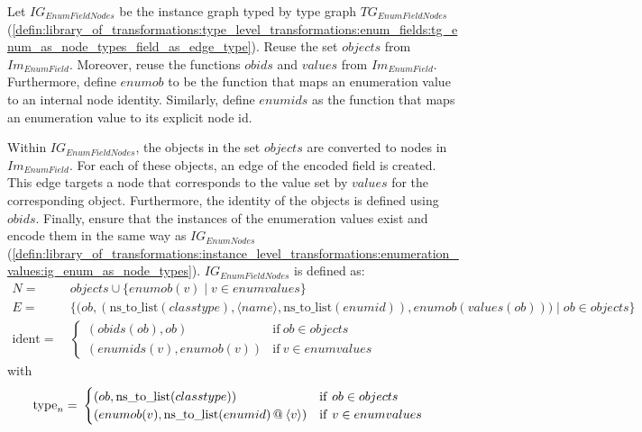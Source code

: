\begin{defin}
\label{defin:library_of_transformations:instance_level_transformations:enum_field_values:ig_enum_as_node_types_field_as_edge_type}
Let $IG_{EnumFieldNodes}$ be the instance graph typed by type graph $TG_{EnumFieldNodes}$ (\cref{defin:library_of_transformations:type_level_transformations:enum_fields:tg_enum_as_node_types_field_as_edge_type}). Reuse the set $objects$ from $Im_{EnumField}$. Moreover, reuse the functions $obids$ and $values$ from $Im_{EnumField}$. Furthermore, define $enumob$ to be the function that maps an enumeration value to an internal node identity. Similarly, define $enumids$ as the function that maps an enumeration value to its explicit node id.

Within $IG_{EnumFieldNodes}$, the objects in the set $objects$ are converted to nodes in $Im_{EnumField}$. For each of these objects, an edge of the encoded field is created. This edge targets a node that corresponds to the value set by $values$ for the corresponding object. Furthermore, the identity of the objects is defined using $obids$. Finally, ensure that the instances of the enumeration values exist and encode them in the same way as $IG_{EnumNodes}$ (\cref{defin:library_of_transformations:instance_level_transformations:enumeration_values:ig_enum_as_node_types}). $IG_{EnumFieldNodes}$ is defined as:
\begin{align*}
N =\ & objects \cup \{enumob(v) \mid v \in enumvalues \} \\
E =\ & \big\{\big(ob, (\mathrm{ns\_\!to\_\!list}(classtype), \langle name \rangle, \mathrm{ns\_\!to\_\!list}(enumid)), enumob(values(ob))\big) \mid ob \in objects \big\} \\
\mathrm{ident} =\ & \begin{cases}
    (obids(ob), ob) & \mathrm{if }\ ob \in objects\\
    (enumids(v), enumob(v)) & \mathrm{if }\ v \in enumvalues
\end{cases}
\end{align*}
with
\begin{align*}
\mathrm{type}_n =\ & \begin{cases}
    (ob, \mathrm{ns\_\!to\_\!list}(classtype)) & \mathrm{if }\ ob \in objects\\
    (enumob(v), \mathrm{ns\_\!to\_\!list}(enumid) \operatorname{@\:} \langle v \rangle) & \mathrm{if }\ v \in enumvalues
\end{cases}
\end{align*}
\end{defin}

